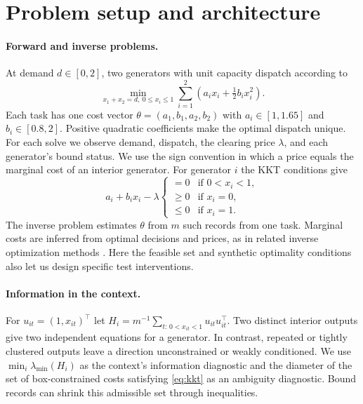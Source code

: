\documentclass[11pt,letterpaper]{article}
\begin{document}
\clearpage
\section{Problem setup and architecture}
\paragraph{Forward and inverse problems.}
At demand \(d\in[0,2]\), two generators with unit capacity dispatch
according to
\begin{equation}
 \min_{x_1+x_2=d,\ 0\le x_i\le 1}
 \sum_{i=1}^{2}\left(a_i x_i+\tfrac12 b_i x_i^2\right).
 \label{eq:dispatch}
\end{equation}
Each task has one cost vector
\(\theta=(a_1,b_1,a_2,b_2)\) with \(a_i\in[1,1.65]\) and
\(b_i\in[0.8,2]\). Positive quadratic coefficients make the optimal
dispatch unique. For each solve we observe demand, dispatch, the
clearing price \(\lambda\), and each generator's bound status. We use
the sign convention in which a price equals the marginal cost of an
interior generator. For generator \(i\) the KKT conditions give
\begin{equation}
a_i+b_ix_i-\lambda
\begin{cases}
=0 & \text{if }0<x_i<1,\\
\geq 0 & \text{if }x_i=0,\\
\leq 0 & \text{if }x_i=1 .
\end{cases}
\label{eq:kkt}
\end{equation}
The inverse problem estimates \(\theta\) from \(m\) such records from one
task. Marginal costs are inferred from optimal decisions and prices,
as in related inverse optimization methods \cite{keshavarz,liang}.
Here the feasible set and synthetic optimality conditions also let us
design specific test interventions.

\paragraph{Information in the context.}
For \(u_{it}=(1,x_{it})^\top\) let
\(H_i=m^{-1}\sum_{t:\,0<x_{it}<1}u_{it}u_{it}^{\top}\).
Two distinct interior outputs give two independent equations for a
generator. In contrast, repeated or tightly clustered outputs leave a
direction unconstrained or weakly conditioned. We use
\(\min_i\lambda_{\min}(H_i)\) as the context's information
diagnostic and the diameter of the set of box-constrained costs
satisfying \eqref{eq:kkt} as an ambiguity diagnostic. Bound records
can shrink this admissible set through inequalities.
\end{document}
